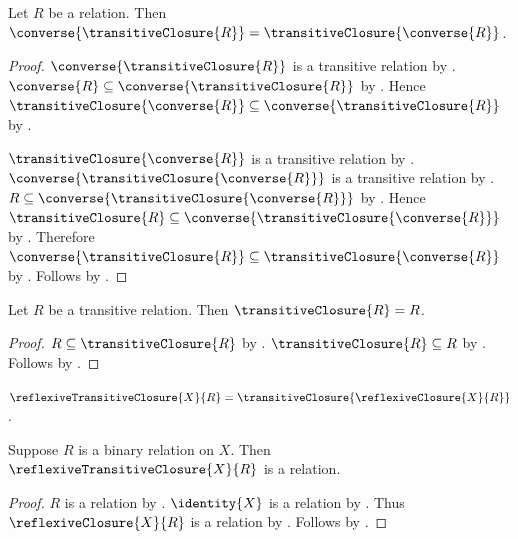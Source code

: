 \begin{proposition}\label{converse_transitive_closure}
    Let $R$ be a relation.
    Then $\converse{\transitiveClosure{R}}
        =\transitiveClosure{\converse{R}}$.
\end{proposition}
\begin{proof}
    $\converse{\transitiveClosure{R}}$ is a transitive relation by
        .
    $\converse{R}\subseteq\converse{\transitiveClosure{R}}$ by
        .
    Hence $\transitiveClosure{\converse{R}}
        \subseteq\converse{\transitiveClosure{R}}$
        by .

    $\transitiveClosure{\converse{R}}$ is a transitive relation by
        .
    $\converse{\transitiveClosure{\converse{R}}}$ is a transitive relation
        by .
    $R\subseteq\converse{\transitiveClosure{\converse{R}}}$ by
        .
    Hence $\transitiveClosure{R}
        \subseteq\converse{\transitiveClosure{\converse{R}}}$
        by .
    Therefore $\converse{\transitiveClosure{R}}
        \subseteq\transitiveClosure{\converse{R}}$ by
        .
    Follows by .
\end{proof}

\begin{proposition}\label{transitive_closure_eq}
    Let $R$ be a transitive relation.
    Then $\transitiveClosure{R}=R$.
\end{proposition}
\begin{proof}
    $R\subseteq\transitiveClosure{R}$ by .
    $\transitiveClosure{R}\subseteq R$
        by .
    Follows by .
\end{proof}

\begin{definition}\label{reflexive_transitive_closure}
    $\reflexiveTransitiveClosure{X}{R}
        = \transitiveClosure{\reflexiveClosure{X}{R}}$.
\end{definition}

\begin{proposition}\label{reflexive_transitive_closure_is_relation}
    Suppose $R$ is a binary relation on $X$.
    Then $\reflexiveTransitiveClosure{X}{R}$ is a relation.
\end{proposition}
\begin{proof}
    $R$ is a relation by .
    $\identity{X}$ is a relation by .
    Thus $\reflexiveClosure{X}{R}$ is a relation
        by .
    Follows by .
\end{proof}

